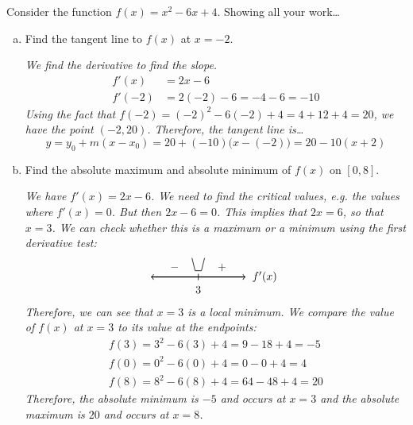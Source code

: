 \documentclass[12pt,letterpaper]{exam}
\begin{document}
\begin{questions}
Consider the function $f(x)= x^2 - 6x + 4$. Showing all your work\dots
	\begin{enumerate}[(a)]
	\item Find the tangent line to $f(x)$ at $x= -2$. \pspace
	
		{\itshape We find the derivative to find the slope.
			\[
			\begin{aligned}
			f'(x)&= 2x - 6 \\
			f'(-2)&= 2(-2) - 6= -4 - 6= -10 
			\end{aligned}
			\]
		Using the fact that $f(-2)= (-2)^2 - 6(-2) + 4= 4 + 12 + 4= 20$, we have the point $(-2, 20)$. Therefore, the tangent line is\dots
			\[
			y= y_0 + m(x - x_0)= 20 + (-10) \big(x - (-2) \big)= 20 - 10(x + 2)
			\]
		} \vspace{3.7cm}
	
	\item Find the absolute maximum and absolute minimum of $f(x)$ on $[0, 8]$. \pspace
	
		{\itshape We have $f'(x)= 2x - 6$. We need to find the critical values, e.g. the values where $f'(x)= 0$. But then $2x - 6= 0$. This implies that $2x= 6$, so that $x= 3$. We can check whether this is a maximum or a minimum using the first derivative test:
			\[
			\begin{tikzpicture}
			\draw[line width=0.03cm,<->] (-1.5,0) -- (1.5,0);
			\draw[line width=0.02cm] (0,-0.1) -- (0,0.1);
			\node at (2.1,0) {$f'(x)$};
			\node at (0,-0.4) {$3$};
			\node at (-0.75,0.3) {$-$};
			\node at (0.75,0.3) {$+$};
			\draw[line width=0.02cm] (-0.2,0.6) -- (-0.1,0.2) -- (0.1,0.2) -- (0.2,0.6);
			\end{tikzpicture}
			\]
		Therefore, we can see that $x= 3$ is a local minimum. We compare the value of $f(x)$ at $x= 3$ to its value at the endpoints:
			\[
			\begin{aligned}
			f(3)= 3^2 - 6(3) + 4= 9 - 18 + 4= -5 \\
			f(0)= 0^2 - 6(0) + 4= 0 - 0 + 4= 4 \\
			f(8)= 8^2 - 6(8) + 4= 64 - 48 + 4= 20
			\end{aligned}
			\]
		Therefore, the absolute minimum is $-5$ and occurs at $x= 3$ and the absolute maximum is $20$ and occurs at $x= 8$.
		}
	\end{enumerate}



\newpage
{} \par\vspace{0.3cm}


\end{questions}
\end{document}
